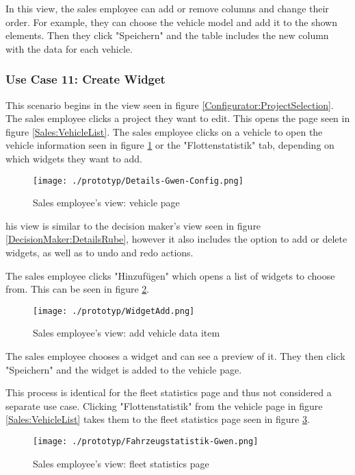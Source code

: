 In this view, the sales employee can add or remove columns and change their order. For example, they can choose the vehicle model and add it to the shown elements. Then they click "Speichern" and the table includes the new column with the data for each vehicle.


\subsubsection{Use Case 11: Create Widget}
This scenario begins in the view seen in figure \ref{Configurator:ProjectSelection}. The sales employee clicks a project they want to edit. This opens the page seen in figure \ref{Sales:VehicleList}. The sales employee clicks on a vehicle to open the vehicle information seen in figure \ref{Sales:VehicleInformation} or the "Flottenstatistik" tab, depending on which widgets they want to add.

\begin{figure}[ht]
  \centering
  \texttt{[image: ./prototyp/Details-Gwen-Config.png]}
  \caption{Sales employee's view: vehicle page}
  \label{Sales:VehicleInformation}
\end{figure}

his view is similar to the decision maker's view seen in figure \ref{DecisionMaker:DetailsRube}, however it also includes the option to add or delete widgets, as well as to undo and redo actions.

The sales employee clicks "Hinzufügen" which opens a list of widgets to choose from. This can be seen in figure \ref{Sales:AddWidget}.

\begin{figure}[ht]
  \centering
  \texttt{[image: ./prototyp/WidgetAdd.png]}
  \caption{Sales employee's view: add vehicle data item}
  \label{Sales:AddWidget}
\end{figure}

The sales employee chooses a widget and can see a preview of it. They then click "Speichern" and the widget is added to the vehicle page.

This process is identical for the fleet statistics page and thus not considered a separate use case. Clicking "Flottenstatistik" from the vehicle page in figure \ref{Sales:VehicleList} takes them to the fleet statistics page seen in figure \ref{Sales:Fleet}.

\begin{figure}[ht]
  \centering
  \texttt{[image: ./prototyp/Fahrzeugstatistik-Gwen.png]}
  \caption{Sales employee's view: fleet statistics page}
  \label{Sales:Fleet}
\end{figure}

